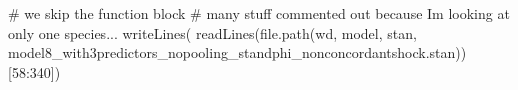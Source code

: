 \documentclass[
  letterpaper,
  DIV=11,
  numbers=noendperiod]{scrartcl}
\newenvironment{Shaded}{\begin{snugshade}}{\end{snugshade}}
\newcommand{\CommentTok}[1]{\textcolor[rgb]{0.37,0.37,0.37}{#1}}
\newcommand{\DecValTok}[1]{\textcolor[rgb]{0.68,0.00,0.00}{#1}}
\newcommand{\FunctionTok}[1]{\textcolor[rgb]{0.28,0.35,0.67}{#1}}
\newcommand{\NormalTok}[1]{\textcolor[rgb]{0.00,0.23,0.31}{#1}}
\newcommand{\SpecialCharTok}[1]{\textcolor[rgb]{0.37,0.37,0.37}{#1}}
\newcommand{\StringTok}[1]{\textcolor[rgb]{0.13,0.47,0.30}{#1}}
\begin{document}
\linespread{0.5}

\begin{Shaded}
\begin{Highlighting}[]
\CommentTok{\# we skip the function block}
\CommentTok{\# many stuff commented out because I\textquotesingle{}m looking at only one species...}
\FunctionTok{writeLines}\NormalTok{(}
  \FunctionTok{readLines}\NormalTok{(}\FunctionTok{file.path}\NormalTok{(wd, }\StringTok{\textquotesingle{}model\textquotesingle{}}\NormalTok{, }\StringTok{\textquotesingle{}stan\textquotesingle{}}\NormalTok{, }
                      \StringTok{\textquotesingle{}model8\_with3predictors\_nopooling\_standphi\_nonconcordantshock.stan\textquotesingle{}}\NormalTok{))[}\DecValTok{58}\SpecialCharTok{:}\DecValTok{340}\NormalTok{])}
\end{Highlighting}
\end{Shaded}
\end{document}
